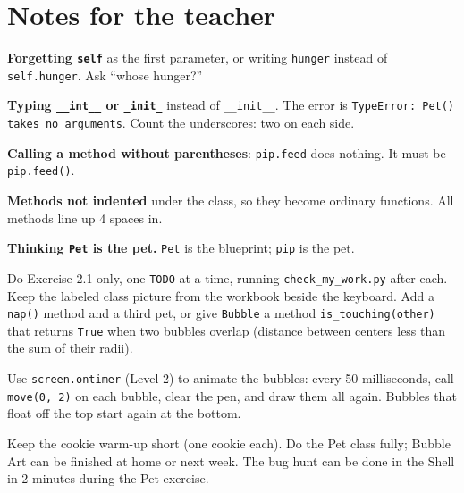 \section{Notes for the teacher}
\begin{commonmistakes}
  \item \textbf{Forgetting \texttt{self}} as the first parameter, or writing \texttt{hunger} instead of \texttt{self.hunger}. Ask \enquote{whose hunger?}
  \item \textbf{Typing \texttt{\_\_int\_\_} or \texttt{\_init\_}} instead of \texttt{\_\_init\_\_}. The error is \texttt{TypeError: Pet() takes no arguments}. Count the underscores: two on each side.
  \item \textbf{Calling a method without parentheses}: \texttt{pip.feed} does nothing. It must be \texttt{pip.feed()}.
  \item \textbf{Methods not indented} under the class, so they become ordinary functions. All methods line up 4 spaces in.
  \item \textbf{Thinking \texttt{Pet} is the pet.} \texttt{Pet} is the blueprint; \texttt{pip} is the pet.
\end{commonmistakes}

\begin{differentiation}
\supportpath Do Exercise 2.1 only, one \texttt{TODO} at a time, running \texttt{check\_my\_work.py} after each. Keep the labeled class picture from the workbook beside the keyboard.
\extensionpath Add a \texttt{nap()} method and a third pet, or give \texttt{Bubble} a method \texttt{is\_touching(other)} that returns \texttt{True} when two bubbles overlap (distance between centers less than the sum of their radii).
\end{differentiation}

\begin{stretchchallenge}
Use \texttt{screen.ontimer} (Level 2) to animate the bubbles: every 50 milliseconds, call \texttt{move(0, 2)} on each bubble, clear the pen, and draw them all again. Bubbles that float off the top start again at the bottom.
\end{stretchchallenge}

\begin{teachernote}
Keep the cookie warm-up short (one cookie each). Do the Pet class fully; Bubble Art can be finished at home or next week. The bug hunt can be done in the Shell in 2 minutes during the Pet exercise.
\end{teachernote}
